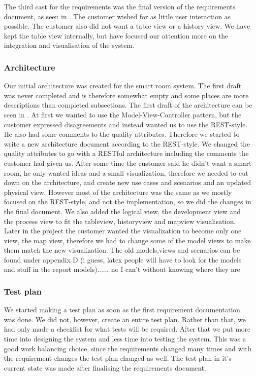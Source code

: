 \documentclass[../document.tex]{subfiles}
\begin{document}
The third cast for the requirements was the final version of the requirements document, as seen in . The customer wished for as little user interaction as possible. The customer also did not want a table view or a history view. We have kept the table view internally, but have focused our attention more on the integration and visualisation of the system.

\subsubsection{Architecture}
Our initial architecture was created for the smart room system. The first draft was never completed and is therefore somewhat empty and some places are more descriptions than completed subsections. The first draft of the architecture can be seen in . At first we wanted to use the Model-View-Controller pattern, but the customer expressed disagreements and instead wanted us to use the REST-style. He also had some comments to the quality attributes. Therefore we started to write a new architecture document according to the REST-style. We changed the quality attributes to go with a RESTful architecture including the comments the customer had given us. After some time the customer said he didn’t want a smart room, he only wanted ideas and a small visualization, therefore we needed to cut down on the architecture, and create new use cases and scenarios and an updated physical view. However most of the architecture was the same as we mostly focused on the REST-style, and not the implementation, so we did the changes in the final document. We also added the logical view, the development view and the process view to fit the tableview, historyview and mapview visualisation. Later in the project the customer wanted the visualization to become only one view, the map view, therefore we had to change some of the model views to make them match the new visualization. The old models,views and scenarios can be found under appendix D {\color{red}(i guess, latex people will have to look for the models and stuff in the report models)...... no I can't without knowing where they are}

\subsubsection{Test plan}
We started making a test plan as soon as the first requirement documentation was done. We did not, however, create an entire test plan. Rather than that, we had only made a checklist for what tests will be required. After that we put more time into designing the system and less time into testing the system. This was a good work balancing choice, since the requirements changed many times and with the requirement changes the test plan changed as well. The test plan in it’s current state was made after finalising the requirements document.
\end{document}
